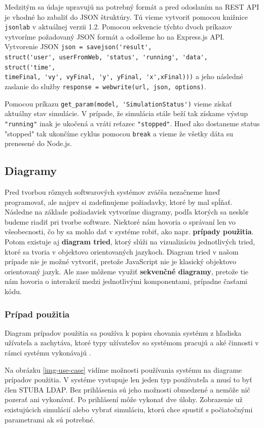 Medzitým sa údaje upravujú na potrebný formát a pred odoslaním na REST API je vhodné ho zabaliť do JSON štruktúry. Tú vieme vytvoriť pomocou knižnice \verb|jsonlab| v aktuálnej verzii 1.2.
Pomocou sekvencie týchto dvoch príkazov vytvoríme požadovaný JSON formát a odošleme ho na Express.js API. Vytvorenie JSON \verb|json = savejson('result',| \\ \verb|struct('user', userFromWeb, 'status', 'running', 'data', struct('time',| \\ \verb|timeFinal, 'vy', vyFinal, 'y', yFinal, 'x',xFinal)))| a jeho následné zaslanie do služby \verb|response = webwrite(url, json, options)|.

Pomocou príkazu \verb|get_param(model, 'SimulationStatus')| vieme získať aktuálny stav simulácie. V prípade, že simulácia stále beží tak získame výstup \verb|"running"| inak je ukočená a vráti reťazec \verb|"stopped"|. Hneď ako dostaneme status "stopped" tak ukončíme cyklus pomocou \verb|break| a vieme že všetky dáta su prenesené do Node.js.

\subsection{Diagramy}
Pred tvorbou rôznych softwarových systémov zväčša nezačneme hneď programovať, ale najprv si zadefinujeme požiadavky, ktoré by mal spĺňať. Následne na základe požiadaviek vytvoríme diagramy, podľa ktorých sa neskôr budeme riadiť pri tvorbe software. Niektoré nám hovoria o správaní len vo všeobecnosti, čo by sa mohlo dať v systéme robiť, ako napr. \textbf{prípady použitia}. Potom existuje aj \textbf{diagram tried}, ktorý slúži na vizualizáciu jednotlivých tried, ktoré sa tvoria v objektovo orientovaných jazykoch. Diagram tried v našom prípade nie je možné vytvoriť, pretože JavaScript nie je klasický objektovo orientovaný jazyk. Ale zase môžeme využiť \textbf{sekvenčné diagramy}, pretože tie nám hovoria o interakcií medzi jednotlivými komponentami, prípadne časťami kódu.

\subsubsection{Prípad použitia}
Diagram prípadov použitia sa používa k popisu chovania systému z hľadiska užívateľa a zachytáva, ktoré typy užívateľov so systémom pracujú a aké činnosti v rámci systému vykonávajú \cite{uml-usecase}.

Na obrázku \ref{img-use-case} vidíme možnosti používania systému na diagrame prípadov použitia. V systéme vystupuje len jeden typ používateľa a musí to byť člen STUBA LDAP. Bez prihlásenia sú jeho možnosti obmedzené a nemôže nič pozerať ani vykonávať. Po prihlásení môže vykonať dve úlohy. Zobrazenie už existujúcich simulácií alebo vybrať simuláciu, ktorú chce spustiť s počiatočnými parametrami ak sú potrebné.

